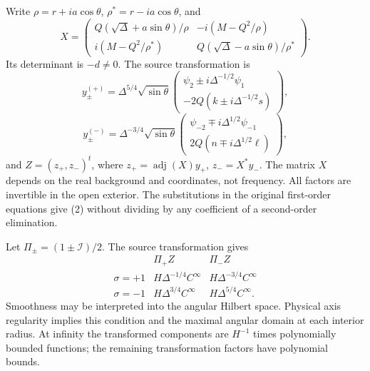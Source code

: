 \documentclass[
  10pt,
  a4paper,
]{article}
\begin{document}
Write \(\rho=r+ia\cos\theta\), \(\rho^*=r-ia\cos\theta\), and \[
 X=\begin{pmatrix}
 Q(\sqrt\Delta+a\sin\theta)/\rho&-i(M-Q^2/\rho)\\
 i(M-Q^2/\rho^*)&Q(\sqrt\Delta-a\sin\theta)/\rho^*
 \end{pmatrix}.
 \tag{6}
\] Its determinant is \(-d\ne0\). The source transformation is \[
 y_\pm^{(+)}=\Delta^{5/4}\sqrt{\sin\theta}
 \begin{pmatrix}\psi_2\pm i\Delta^{-1/2}\psi_1\\
 -2Q(k\pm i\Delta^{-1/2}s)\end{pmatrix},
\] \[
 y_\pm^{(-)}=\Delta^{-3/4}\sqrt{\sin\theta}
 \begin{pmatrix}\psi_{-2}\mp i\Delta^{1/2}\psi_{-1}\\
 2Q(n\mp i\Delta^{1/2}\ell)\end{pmatrix},
\] and \(Z=(z_+,z_-)^t\), where \(z_+=\operatorname{adj}(X)y_+\),
\(z_-=X^*y_-\). The matrix \(X\) depends on the real background and
coordinates, not frequency. All factors are invertible in the open
exterior. The substitutions in the original first-order equations give
(2) without dividing by any coefficient of a second-order elimination.

Let \(\Pi_\pm=(1\pm\mathcal I)/2\). The source transformation gives \[
\begin{array}{c|cc}
 &\Pi_+Z&\Pi_-Z\\ \hline
 \sigma=+1&H\Delta^{-1/4}C^\infty&H\Delta^{-3/4}C^\infty\\
 \sigma=-1&H\Delta^{3/4}C^\infty&H\Delta^{5/4}C^\infty .
\end{array}
 \tag{7}
\] Smoothness may be interpreted into the angular Hilbert space.
Physical axis regularity implies this condition and the maximal angular
domain at each interior radius. At infinity the transformed components
are \(H^{-1}\) times polynomially bounded functions; the remaining
transformation factors have polynomial bounds.
\end{document}

